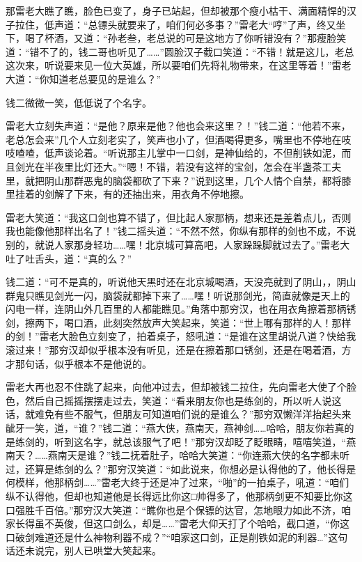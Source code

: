 \documentclass[12pt,oneside]{book}
\begin{document}
那雷老大瞧了瞧，脸色已变了，身子已站起，但却被那个瘦小枯干、满面精悍的汉子拉住，低声道：``总镖头就要来了，咱们何必多事？''雷老大``哼''了声，终又坐下，喝了杯酒，又道：``孙老叁，老总说的可是这地方了你听错没有？''那瘦脸笑道：``错不了的，钱二哥也听见了\ldots\ldots{}''圆脸汉子截口笑道：``不错！就是这儿，老总这次来，听说要来见一位大英雄，所以要咱们先将礼物带来，在这里等着！''雷老大道：``你知道老总要见的是谁么？''

钱二微微一笑，低低说了个名字。

雷老大立刻失声道：``是他？原来是他？他也会来这里？！''钱二道：``他若不来，老总怎会来''几个人立刻老实了，笑声也小了，但酒喝得更多，嘴里也不停地在吱吱喳喳，低声谈论着。``听说那主儿掌中一口剑，是神仙给的，不但削铁如泥，而且剑光在半夜里比灯还大。''``嗯！不错，若没有这祥的宝剑，怎会在半盏茶工夫里，就把阴山那群恶鬼的脑袋都砍了下来？''说到这里，几个人情个自禁，都将膝里挂着的剑解了下来，有的还抽出来，用衣角不停地擦。

雷老大笑道：``我这口剑也算不错了，但比起人家那柄，想来还是差着点儿，否则我也能像他那样出名了！''钱二摇头道：``不然不然，你纵有那样的剑也不成，不说别的，就说人家那身轻功\ldots\ldots 嘿！北京城可算高吧，人家跺跺脚就过去了。''雷老大吐了吐舌头，道：``真的么？''

钱二道：``可不是真的，听说他天黑时还在北京城喝酒，天没亮就到了阴山，，阴山群鬼只瞧见剑光一闪，脑袋就都掉下来了\ldots\ldots 嘿！听说那剑光，简直就像是天上的闪电一样，连阴山外几百里的人都能瞧见。''角落中那穷汉，也在用衣角擦着那柄锈剑，擦两下，喝口酒，此刻突然放声大笑起来，笑道：``世上哪有那样的人！那样的剑！''雷老大脸色立刻变了，拍着桌子，怒吼道：``是谁在这里胡说八道？快给我滚过来！''那穷汉却似乎根本没有听见，还是在擦着那口锈剑，还是在喝着酒，方才那句话，似乎根本不是他说的。

雷老大再也忍不住跳了起来，向他冲过去，但却被钱二拉住，先向雷老大使了个脸色，然后自己摇摇摆摆走过去，笑道：``看来朋友你也是练剑的，所以听人说这话，就难免有些不服气，但朋友可知道咱们说的是谁么？''那穷双懒洋洋抬起头来龇牙一笑，道，``谁？''钱二道：``燕大侠，燕南天，燕神剑\ldots\ldots 哈哈，朋友你若真的是练剑的，听到这名字，就总该服气了吧！''那穷汉却眨了眨眼睛，嘻嘻笑道，``燕南天？\ldots\ldots 燕南天是谁？''钱二抚着肚子，哈哈大笑道：``你连燕大侠的名字都未听过，还算是练剑的么？''那穷汉笑道：``如此说来，你想必是认得他的了，他长得是何模样，他那柄剑\ldots\ldots{}''雷老大终于还是冲了过来，``啪''的一拍桌子，吼道：``咱们纵不认得他，但却也知道他是长得远比你这□帅得多了，他那柄剑更不知要比你这口强胜千百倍。''那穷汉大笑道：``瞧你也是个保镖的达官，怎地眼力如此不济，咱家长得虽不英俊，但这口剑么，却是\ldots\ldots{}''雷老大仰天打了个哈哈，截口道，``你这口破剑难道还是什么神物利器不成？''``咱家这口剑，正是削铁如泥的利器\ldots{}''这句话还未说完，别人已哄堂大笑起来。
\end{document}
